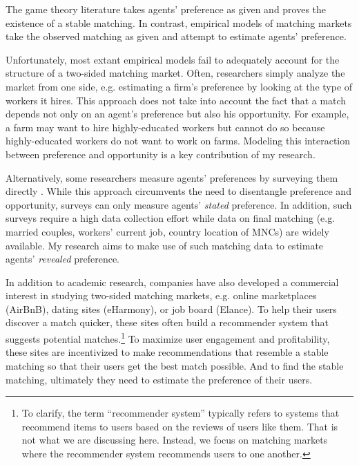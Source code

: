The game theory literature takes agents' preference as given and proves the
existence of a stable matching. In contrast, empirical models of matching
markets take the observed matching as given and attempt to estimate agents'
preference.

Unfortunately, most extant empirical models fail to adequately account for the
structure of a two-sided matching market. Often, researchers simply analyze the
market from one side, e.g. estimating a firm's preference by looking at the type
of workers it hires. This approach does not take into account the fact that a
match depends not only on an agent's preference but also his opportunity. For
example, a farm may want to hire highly-educated workers but cannot do so
because highly-educated workers do not want to work on farms. Modeling this
interaction between preference and opportunity is a key contribution of my
research.

Alternatively, some researchers measure agents' preferences by surveying them
directly \citep{Posner2001, Sprecher1994}. While this approach circumvents the
need to disentangle preference and opportunity, surveys can only measure agents'
\textit{stated} preference. In addition, such surveys require a high data
collection effort while data on final matching (e.g. married couples, workers'
current job, country location of MNCs) are widely available. My research aims to
make use of such matching data to estimate agents' \textit{revealed} preference.

In addition to academic research, companies have also developed a commercial
interest in studying two-sided matching markets, e.g. online marketplaces
(AirBnB), dating sites (eHarmony), or job board (Elance). To help their users
discover a match quicker, these sites often build a recommender system that
suggests potential matches.\footnote{To clarify, the term ``recommender system''
  typically refers to systems that recommend items to users based on the reviews
  of users like them. That is not what we are discussing here. Instead, we focus
  on matching markets where the recommender system recommends users to one
  another.} To maximize user engagement and profitability, these sites are
incentivized to make recommendations that resemble a stable matching so that
their users get the best match possible. And to find the stable matching,
ultimately they need to estimate the preference of their users.

